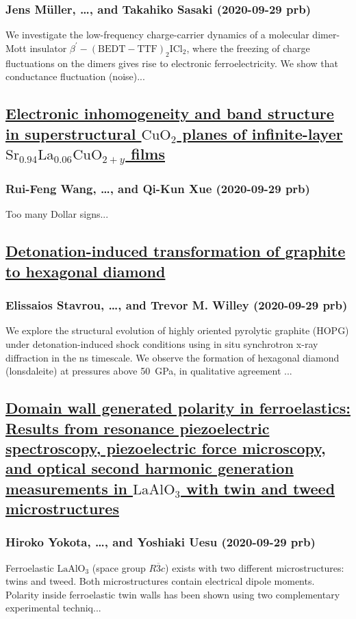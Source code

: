 \subsubsection*{Jens Müller, \dots, and Takahiko Sasaki (2020-09-29 prb)}
We investigate the low-frequency charge-carrier dynamics of a molecular dimer-Mott insulator ${β}^{′}−{(\mathrm{BEDT}−\mathrm{TTF})}_{2}{\mathrm{ICl}}_{2}$, where the freezing of charge fluctuations on the dimers gives rise to electronic ferroelectricity. We show that conductance fluctuation (noise)...
\subsection*{\href{http://link.aps.org/doi/10.1103/PhysRevB.102.100508}{Electronic inhomogeneity and band structure in superstructural ${\mathrm{CuO}}_{2}$ planes of infinite-layer ${\mathrm{Sr}}_{0.94}{\mathrm{La}}_{0.06}{\mathrm{CuO}}_{2+y}$ films}}
\subsubsection*{Rui-Feng Wang, \dots, and Qi-Kun Xue (2020-09-29 prb)}
Too many Dollar signs...
\subsection*{\href{http://link.aps.org/doi/10.1103/PhysRevB.102.104116}{Detonation-induced transformation of graphite to hexagonal diamond}}
\subsubsection*{Elissaios Stavrou, \dots, and Trevor M. Willey (2020-09-29 prb)}
We explore the structural evolution of highly oriented pyrolytic graphite (HOPG) under detonation-induced shock conditions using in situ synchrotron x-ray diffraction in the ns timescale. We observe the formation of hexagonal diamond (lonsdaleite) at pressures above 50 GPa, in qualitative agreement ...
\subsection*{\href{http://link.aps.org/doi/10.1103/PhysRevB.102.104117}{Domain wall generated polarity in ferroelastics: Results from resonance piezoelectric spectroscopy, piezoelectric force microscopy, and optical second harmonic generation measurements in $\mathrm{La}\mathrm{Al}{\mathrm{O}}_{3}$ with twin and tweed microstructures}}
\subsubsection*{Hiroko Yokota, \dots, and Yoshiaki Uesu (2020-09-29 prb)}
Ferroelastic $\mathrm{La}\mathrm{Al}{\mathrm{O}}_{3}$ (space group $R\overline{3}c$) exists with two different microstructures: twins and tweed. Both microstructures contain electrical dipole moments. Polarity inside ferroelastic twin walls has been shown using two complementary experimental techniq...
